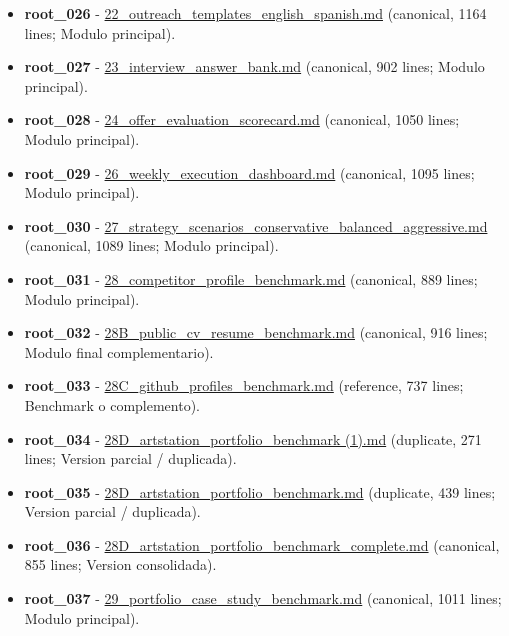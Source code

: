\begin{itemize}
\item \textbf{root\_026} - \href{file:///E:/Laboral/22_outreach_templates_english_spanish.md}{22\_outreach\_templates\_english\_spanish.md} (canonical, 1164 lines; Modulo principal).
\item \textbf{root\_027} - \href{file:///E:/Laboral/23_interview_answer_bank.md}{23\_interview\_answer\_bank.md} (canonical, 902 lines; Modulo principal).
\item \textbf{root\_028} - \href{file:///E:/Laboral/24_offer_evaluation_scorecard.md}{24\_offer\_evaluation\_scorecard.md} (canonical, 1050 lines; Modulo principal).
\item \textbf{root\_029} - \href{file:///E:/Laboral/26_weekly_execution_dashboard.md}{26\_weekly\_execution\_dashboard.md} (canonical, 1095 lines; Modulo principal).
\item \textbf{root\_030} - \href{file:///E:/Laboral/27_strategy_scenarios_conservative_balanced_aggressive.md}{27\_strategy\_scenarios\_conservative\_balanced\_aggressive.md} (canonical, 1089 lines; Modulo principal).
\item \textbf{root\_031} - \href{file:///E:/Laboral/28_competitor_profile_benchmark.md}{28\_competitor\_profile\_benchmark.md} (canonical, 889 lines; Modulo principal).
\item \textbf{root\_032} - \href{file:///E:/Laboral/28B_public_cv_resume_benchmark.md}{28B\_public\_cv\_resume\_benchmark.md} (canonical, 916 lines; Modulo final complementario).
\item \textbf{root\_033} - \href{file:///E:/Laboral/28C_github_profiles_benchmark.md}{28C\_github\_profiles\_benchmark.md} (reference, 737 lines; Benchmark o complemento).
\item \textbf{root\_034} - \href{file:///E:/Laboral/28D_artstation_portfolio_benchmark\%20\%281\%29.md}{28D\_artstation\_portfolio\_benchmark (1).md} (duplicate, 271 lines; Version parcial / duplicada).
\item \textbf{root\_035} - \href{file:///E:/Laboral/28D_artstation_portfolio_benchmark.md}{28D\_artstation\_portfolio\_benchmark.md} (duplicate, 439 lines; Version parcial / duplicada).
\item \textbf{root\_036} - \href{file:///E:/Laboral/28D_artstation_portfolio_benchmark_complete.md}{28D\_artstation\_portfolio\_benchmark\_complete.md} (canonical, 855 lines; Version consolidada).
\item \textbf{root\_037} - \href{file:///E:/Laboral/29_portfolio_case_study_benchmark.md}{29\_portfolio\_case\_study\_benchmark.md} (canonical, 1011 lines; Modulo principal).

\end{itemize}
